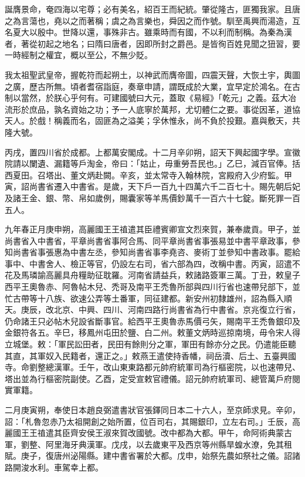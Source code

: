\begin{pinyinscope}
 誕膺景命，奄四海以宅尊；必有美名，紹百王而紀統。肇從隆古，匪獨我家。且唐之為言蕩也，堯以之而著稱；虞之為言樂也，舜因之而作號。馴至禹興而湯造，互名夏大以殷中。世降以還，事殊非古。雖乘時而有國，不以利而制稱。為秦為漢者，著從初起之地名；曰隋曰唐者，因即所封之爵邑。是皆徇百姓見聞之狃習，要一時經制之權宜，概以至公，不無少貶。



 我太祖聖武皇帝，握乾符而起朔土，以神武而膺帝圖，四震天聲，大恢土宇，輿圖之廣，歷古所無。頃者耆宿詣庭，奏章申請，謂既成於大業，宜早定於鴻名。在古制以當然，於朕心乎何有。可建國號曰大元，蓋取《易經》「乾元」之義。茲大冶流形於庶品，孰名資始之功；予一人底寧於萬邦，尤切體仁之要。事從因革，道協天人。於戲！稱義而名，固匪為之溢美；孚休惟永，尚不負於投艱。嘉與敷天，共隆大號。



 丙戌，置四川省於成都。上都萬安閣成。十二月辛卯朔，詔天下興起國字學。宣徽院請以闌遺、漏籍等戶淘金，帝曰：「姑止，毋重勞吾民也。」乙巳，減百官俸。括西夏田。召塔出、董文炳赴闕。辛亥，並太常寺入翰林院，宮殿府入少府監。甲寅，詔尚書省遷入中書省。是歲，天下戶一百九十四萬六千二百七十。賜先朝后妃及諸王金、銀、幣、帛如歲例，賜囊家等羊馬價鈔萬千一百六十七錠。斷死罪一百五人。



 九年春正月庚申朔，高麗國王王禃遣其臣禮賓卿宣文烈來賀，兼奉歲貢。甲子，並尚書省入中書省，平章尚書省事阿合馬、同平章尚書省事張易並中書平章政事，參知尚書省事張惠為中書左丞，參知尚書省事李堯咨、麥術丁並參知中書政事。罷給事中、中書舍人、檢正等官，仍設左右司，省六部為四，改稱中書。丙寅，詔遣不花及馬璘諭高麗具舟糧助征耽羅。河南省請益兵，敕諸路簽軍三萬。丁丑，敕皇子西平王奧魯赤、阿魯帖木兒、禿哥及南平王禿魯所部與四川行省也速帶兒部下，並忙古帶等十八族、欲速公弄等土番軍，同征建都。新安州初隸雄州，詔為縣入順天。庚辰，改北京、中興、四川、河南四路行尚書省為行中書省。京兆復立行省，仍命諸王只必帖木兒設省斷事官。給西平王奧魯赤馬價弓矢，賜南平王禿魯銀印及金銀符各五。辛巳，移鳳州屯田於鹽、白二州。敕董文炳時巡掠南境，毋令宋人得立城堡。敕：「軍民訟田者，民田有餘則分之軍，軍田有餘亦分之民。仍遣能臣聽其直，其軍奴入民籍者，還正之。」敕燕王遣使持香幡，祠岳瀆、后土、五臺興國寺。命劉整總漢軍。壬午，改山東東路都元帥府統軍司為行樞密院，以也速帶兒、塔出並為行樞密院副使。乙酉，定受宣敕官禮儀。詔元帥府統軍司、總管萬戶府閱實軍籍。



 二月庚寅朔，奉使日本趙良弼遣書狀官張鐸同日本二十六人，至京師求見。辛卯，詔：「札魯忽赤乃太祖開創之始所置，位百司右，其賜銀印，立左右司。」壬辰，高麗國王王禃遣其臣齊安侯王淑來賀改國號。改中都為大都。甲午，命阿術典蒙古軍，劉整、阿里海牙典漢軍。戊戌，以去歲東平及西京等州縣旱蝗水潦，免其租賦。庚子，復唐州泌陽縣。建中書省署於大都。戊申，始祭先農如祭社之儀。詔諸路開浚水利。車駕幸上都。




\end{pinyinscope}
